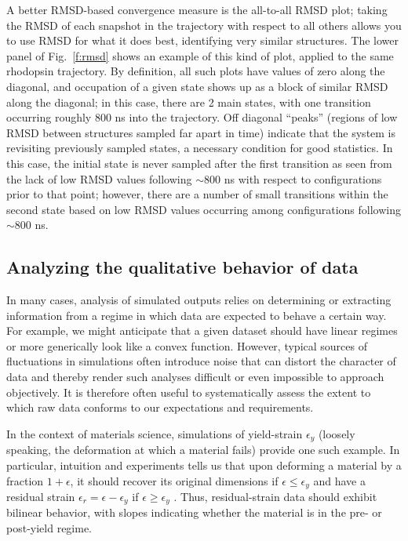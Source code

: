 A better RMSD-based convergence measure is the all-to-all RMSD plot; taking the
RMSD of each snapshot in the trajectory with respect to all others allows you to
use RMSD for what it does best, identifying very similar structures.  The lower
panel of Fig.\ \ref{f:rmsd} shows an example of this kind of plot, applied to
the same rhodopsin trajectory.  By definition, all such plots have values of zero
along the diagonal, and occupation of a given state shows up as a block of
similar RMSD along the diagonal; in this case, there are 2 main states, with one
transition occurring roughly 800 ns into the trajectory.  Off diagonal ``peaks''
(regions of low RMSD between structures sampled far apart in time) indicate that
the system is revisiting previously sampled states, a necessary condition for
good statistics.  In this case, the initial state is never sampled after the
first transition as seen from the lack of low RMSD values following $\sim$800 ns with respect to configurations prior to that point;
however, there are a number of small transitions within the second state based on low RMSD values occurring among configurations following $\sim$800 ns.

\subsection{Analyzing the qualitative behavior of data}


In many cases, analysis of simulated outputs relies on determining or extracting information from a regime in which data are expected to behave a certain way.  For example, we might anticipate that a given dataset should have linear regimes or more generically look like a convex function.  However, typical sources of fluctuations in simulations often introduce noise that can distort the character of data and thereby render such analyses difficult or even impossible to approach objectively.  It is therefore often useful to systematically assess the extent to which raw data conforms to our expectations and requirements.

In the context of materials science, simulations of yield-strain $\epsilon_y$ (loosely speaking, the deformation at which a material fails) provide one such example.  In particular, intuition and experiments tells us that upon deforming a material by a fraction $1+\epsilon$, it should recover its original dimensions if $\epsilon \le \epsilon_y$ and have a residual strain $\epsilon_r = \epsilon - \epsilon_y$ if $\epsilon \ge \epsilon_y$ \cite{patrone2}.  Thus, residual-strain data should exhibit bilinear behavior, with slopes indicating whether the material is in the pre- or post-yield regime.


